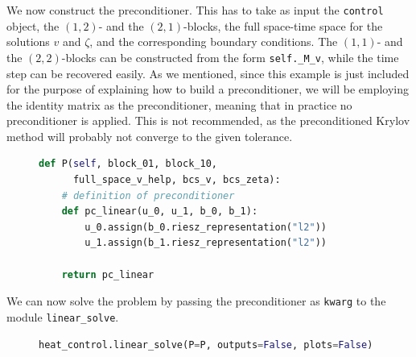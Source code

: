 \documentclass[letterpaper,10pt,english]{sphinxmanual}
\begin{document}
We now construct the preconditioner. This has to take as input the \texttt{control} object, the $(1,2)$- and the $(2,1)$-blocks, the full space-time space for the solutions $v$ and $\zeta$, and the corresponding boundary conditions. The $(1,1)$- and the $(2,2)$-blocks can be constructed from the form \texttt{self.{\_}M{\_}v}, while the time step can be recovered easily. As we mentioned, since this example is just included for the purpose of explaining how to build a preconditioner, we will be employing the identity matrix as the preconditioner, meaning that in practice no preconditioner is applied. This is not recommended, as the preconditioned Krylov method will probably not converge to the given tolerance.
\begin{figure}[!h]
\begin{lstlisting}[language=Python]
def P(self, block_01, block_10,
      full_space_v_help, bcs_v, bcs_zeta):
    # definition of preconditioner
    def pc_linear(u_0, u_1, b_0, b_1):
        u_0.assign(b_0.riesz_representation("l2"))
        u_1.assign(b_1.riesz_representation("l2"))

    return pc_linear
\end{lstlisting}
\end{figure}

We can now solve the problem by passing the preconditioner as \texttt{kwarg} to the module \texttt{linear{\_}solve}.
\begin{figure}[!h]
\begin{lstlisting}[language=Python]
heat_control.linear_solve(P=P, outputs=False, plots=False)
\end{lstlisting}
\end{figure}
\end{document}
